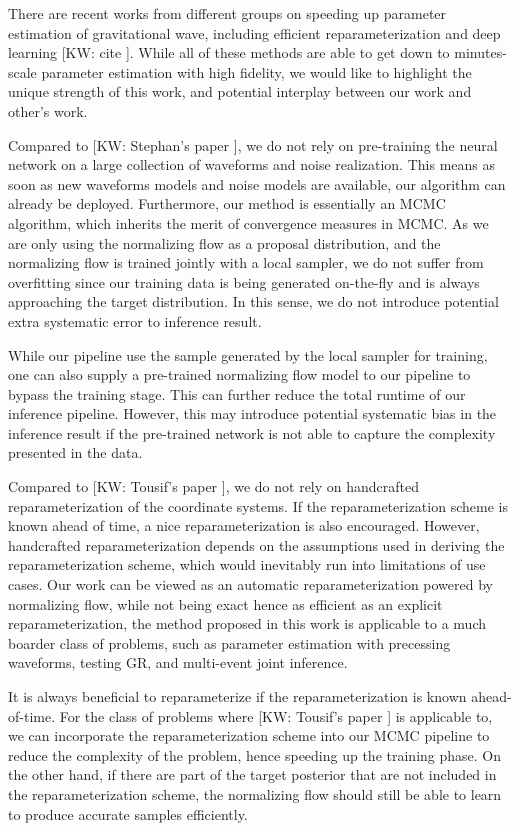 \documentclass[twocolumn]{aastex631}
\newcommand{\kw}[1]{{\color{rb4}[KW: #1 ]}}
\begin{document}
There are recent works from different groups on speeding up parameter estimation
of gravitational wave, including efficient reparameterization and deep learning
\kw{cite}. While all of these methods are able to get down to minutes-scale parameter
estimation with high fidelity, we would like to highlight the unique strength of
this work, and potential interplay between our work and other's work.

Compared to \kw{Stephan's paper}, we do not rely on pre-training the neural
network on a large collection of waveforms and noise realization. This means as
soon as new waveforms models and noise models are available, our algorithm can
already be deployed. Furthermore, our method is essentially an MCMC algorithm,
which inherits the merit of convergence measures in MCMC. As we are only using
the normalizing flow as a proposal distribution, and the normalizing flow is
trained jointly with a local sampler, we do not suffer from overfitting since
our training data is being generated on-the-fly and is always approaching the
target distribution. In this sense, we do not introduce potential extra
systematic error to inference result.

While our pipeline use the sample generated by the local sampler for training,
one can also supply a pre-trained normalizing flow model to our pipeline to
bypass the training stage. This can further reduce the total runtime of our
inference pipeline. However, this may introduce potential systematic bias in the
inference result if the pre-trained network is not able to capture the
complexity presented in the data.

Compared to \kw{Tousif's paper}, we do not rely on handcrafted
reparameterization of the coordinate systems. If the reparameterization scheme
is known ahead of time, a nice reparameterization is also encouraged. However,
handcrafted reparameterization depends on the assumptions used in deriving the
reparameterization scheme, which would inevitably run into limitations of use
cases. Our work can be viewed as an automatic reparameterization powered by
normalizing flow, while not being exact hence as efficient as an explicit
reparameterization, the method proposed in this work is applicable to a much
boarder class of problems, such as parameter estimation with precessing
waveforms, testing GR, and multi-event joint inference.

It is always beneficial to reparameterize if the reparameterization is known
ahead-of-time. For the class of problems where \kw{Tousif's paper} is applicable
to, we can incorporate the reparameterization scheme into our MCMC pipeline to
reduce the complexity of the problem, hence speeding up the training phase.
On the other hand, if there are part of the target posterior that are not
included in the reparameterization scheme, the normalizing flow should still be
able to learn to produce accurate samples efficiently.
\end{document}
